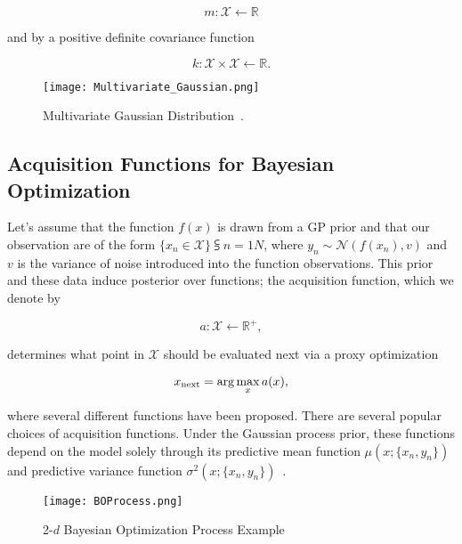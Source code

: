 \begin{equation}
	m : \mathcal{X} \leftarrow \mathbb{R}
\end{equation}

and by a positive definite covariance function 

\begin{equation}
	k : \mathcal{X} \times \mathcal{X} \leftarrow \mathbb{R}.
\end{equation}

\begin{figure} [h!]
	\centering
	\texttt{[image: Multivariate\_Gaussian.png]}
	\caption{Multivariate Gaussian Distribution~\cite{MNDWikipedia}.}
	\label{fig:Multivatiate_Gaussian}
\end{figure}

\subsection{Acquisition Functions for Bayesian Optimization} Let's assume that the function $f(x)$ is drawn from a GP prior and that our observation are of the form $\{x_n \in \mathcal{X}\}\subsup{}{ n=1}{N}$, where $y_n \sim \mathcal{N}(f(x_n), v)$ and $v$ is the variance of noise introduced into the function observations. This prior and these data induce  posterior over functions; the acquisition function, which we denote by

\begin{equation}
	a : \mathcal{X} \leftarrow \mathbb{R}^+,
\end{equation}

determines what point in $\mathcal{X}$ should be evaluated next via a proxy optimization

\begin{equation}
	x\textsubscript{next} = \arg\max_{x}a(x),
\end{equation}

where several different functions have been proposed. There are several popular choices of acquisition functions. Under the Gaussian process prior, these functions depend on the model solely through its predictive mean function $\mu(x; \{x_n, y_n\})$ and predictive variance function $\sigma^2(x; \{x_n, y_n\})$~\cite{NIPS2012_4522}.


\begin{figure} [h!]
	\centering
	\texttt{[image: BOProcess.png]}
	\caption{2-$d$ Bayesian Optimization Process Example~\cite{BayesianOptimizationImage}}
	\label{fig:BoProcess}
\end{figure}

